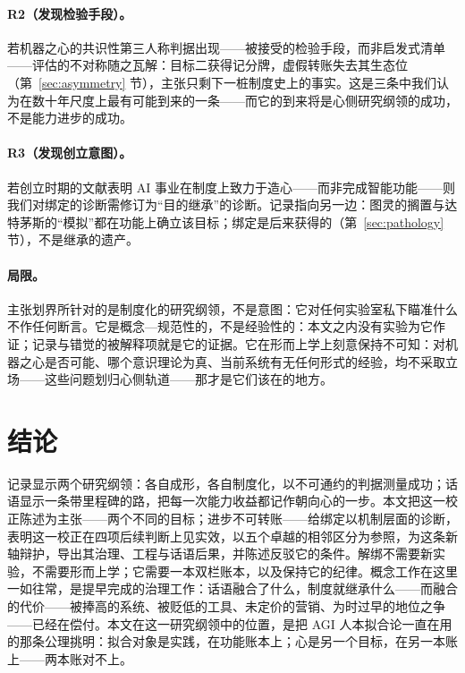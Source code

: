 \documentclass[10pt,fontset=fandol]{ctexart}
\begin{document}
\paragraph{R2（发现检验手段）。}若机器之心的共识性第三人称判据出现——被接受的检验手段，而非启发式清单\cite{butlin2023consciousness}——评估的不对称随之瓦解：目标二获得记分牌，虚假转账失去其生态位（第~\ref{sec:asymmetry} 节），主张只剩下一桩制度史上的事实。这是三条中我们认为在数十年尺度上最有可能到来的一条——而它的到来将是心侧研究纲领的成功，不是能力进步的成功。

\paragraph{R3（发现创立意图）。}若创立时期的文献表明 AI 事业在制度上致力于造心——而非完成智能功能——则我们对绑定的诊断需修订为“目的继承”的诊断。记录指向另一边：图灵的搁置\cite{turing1950}与达特茅斯的“模拟”\cite{mccarthy1955proposal}都在功能上确立该目标；绑定是后来获得的（第~\ref{sec:pathology} 节），不是继承的遗产。

\paragraph{局限。}主张划界所针对的是制度化的研究纲领，不是意图：它对任何实验室私下瞄准什么不作任何断言。它是概念—规范性的，不是经验性的：本文之内没有实验为它作证；记录与错觉的被解释项就是它的证据。它在形而上学上刻意保持不可知：对机器之心是否可能、哪个意识理论为真、当前系统有无任何形式的经验，均不采取立场——这些问题划归心侧轨道——那才是它们该在的地方。

\section{结论}\label{sec:conclusion}

记录显示两个研究纲领：各自成形，各自制度化，以不可通约的判据测量成功；话语显示一条带里程碑的路，把每一次能力收益都记作朝向心的一步。本文把这一校正陈述为主张——两个不同的目标；进步不可转账——给绑定以机制层面的诊断，表明这一校正在四项后续判断上见实效，以五个卓越的相邻区分为参照，为这条新轴辩护，导出其治理、工程与话语后果，并陈述反驳它的条件。解绑不需要新实验，不需要形而上学；它需要一本双栏账本，以及保持它的纪律。概念工作在这里一如往常，是提早完成的治理工作：话语融合了什么，制度就继承什么——而融合的代价——被捧高的系统、被贬低的工具、未定价的营销、为时过早的地位之争——已经在偿付。本文在这一研究纲领中的位置，是把 AGI 人本拟合论一直在用的那条公理挑明：拟合对象是实践，在功能账本上；心是另一个目标，在另一本账上——两本账对不上。
\end{document}
